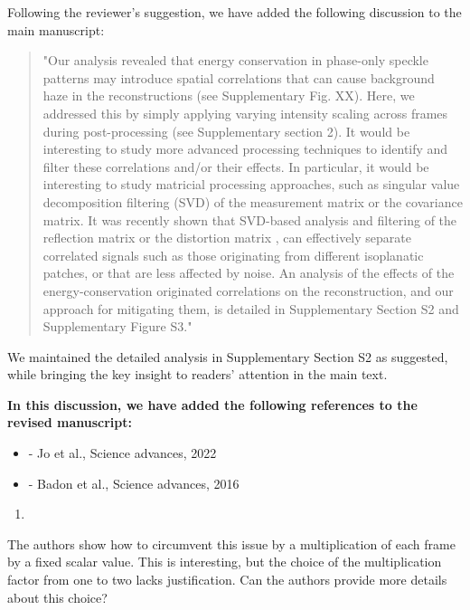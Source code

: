 \documentclass[12pt]{article}
\newenvironment{solved_reviewercomment}
    {\begin{tcolorbox}[width=\linewidth,colback=gray!5,colframe=solved_commentcolor!50,title=Reviewer Comment,left=5pt,right=5pt]}
    {\end{tcolorbox}}
\newenvironment{ourresponse}
    {\begin{tcolorbox}[width=\linewidth,breakable,enhanced,colback=gray!5,colframe=responsecolor!50,title=Response,left=5pt,right=5pt]}
    {\end{tcolorbox}}
\begin{document}
\begin{ourresponse}
Following the reviewer's suggestion, we have added the following discussion to the main manuscript: 
\begin{quote}
    "Our analysis revealed that energy conservation in phase-only speckle patterns may introduce spatial correlations that can cause background haze in the reconstructions (see Supplementary Fig. XX). Here, we addressed this by simply applying varying intensity scaling across frames during post-processing (see Supplementary section 2). It would be interesting to study more advanced processing techniques to identify and filter these correlations and/or their effects. In particular, it would be interesting to study matricial processing approaches, such as singular value decomposition filtering (SVD) of the measurement matrix or the covariance matrix. It was recently shown that SVD-based analysis and filtering of the reflection matrix or the distortion matrix \cite{jo2022through, badon2016smart, badon2020distortion},  can effectively separate correlated signals such as those originating from different isoplanatic patches, or that are less affected by noise. 
    An analysis of the effects of the energy-conservation originated correlations on the reconstruction, and our approach for mitigating them, is detailed in Supplementary Section S2 and Supplementary Figure S3."
\end{quote}
We maintained the detailed analysis in Supplementary Section S2 as suggested, while bringing the key insight to readers' attention in the main text.

\textbf{In this discussion, we have added the following references to the revised manuscript:}
\begin{itemize}[nosep]
\item \cite{jo2022through} - Jo et al., Science advances, 2022
\item \cite{badon2016smart} - Badon et al., Science advances, 2016
\end{itemize}

\end{ourresponse}


    
\begin{enumerate}[label=\arabic*., resume]
\item \leavevmode
\end{enumerate}
\vspace{-1em}
\begin{solved_reviewercomment}
    The authors show how to circumvent this issue by a multiplication of each frame by a fixed scalar value. This is interesting, but the choice of the multiplication factor from one to two lacks justification. Can the authors provide more details about this choice? 
\end{solved_reviewercomment}
\end{document}

